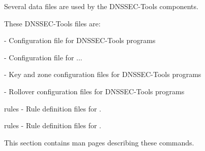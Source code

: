 
Several data files are used by the DNSSEC-Tools components.

These DNSSEC-Tools files are:

\begin{description}

\item{} - Configuration file for DNSSEC-Tools programs

\item{} - Configuration file for ...

\item{} - Key and zone configuration files for DNSSEC-Tools
programs

\item{} - Rollover configuration files for DNSSEC-Tools programs

\item{ rules} - Rule definition files for
.

\item{ rules} - Rule definition files for .

\end{description}

This section contains man pages describing these commands.







